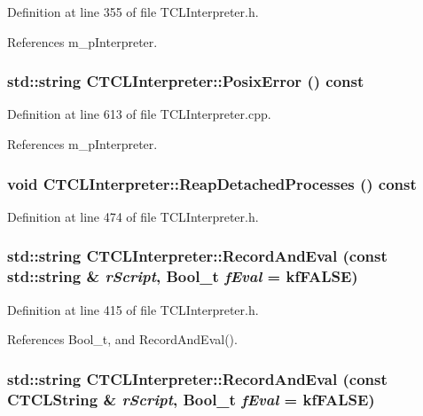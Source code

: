 Definition at line 355 of file TCLInterpreter.h.

References m\_\-p\-Interpreter.
\subsubsection{\setlength{\rightskip}{0pt plus 5cm}std::string CTCLInterpreter::Posix\-Error () const}\label{classCTCLInterpreter_a32}




Definition at line 613 of file TCLInterpreter.cpp.

References m\_\-p\-Interpreter.
\subsubsection{\setlength{\rightskip}{0pt plus 5cm}void CTCLInterpreter::Reap\-Detached\-Processes () const\hspace{0.3cm}{\tt  [inline]}}\label{classCTCLInterpreter_a35}




Definition at line 474 of file TCLInterpreter.h.
\subsubsection{\setlength{\rightskip}{0pt plus 5cm}std::string CTCLInterpreter::Record\-And\-Eval (const std::string \& {\em r\-Script}, {\bf Bool\_\-t} {\em f\-Eval} = {\bf kf\-FALSE})\hspace{0.3cm}{\tt  [inline]}}\label{classCTCLInterpreter_a16}




Definition at line 415 of file TCLInterpreter.h.

References Bool\_\-t, and Record\-And\-Eval().
\subsubsection{\setlength{\rightskip}{0pt plus 5cm}std::string CTCLInterpreter::Record\-And\-Eval (const {\bf CTCLString} \& {\em r\-Script}, {\bf Bool\_\-t} {\em f\-Eval} = {\bf kf\-FALSE})\hspace{0.3cm}{\tt  [inline]}}\label{classCTCLInterpreter_a15}




